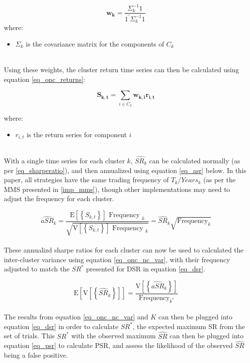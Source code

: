 \documentclass[a4paper,11pt,oneside]{article}
\theoremstyle{plain}
\theoremstyle{definition}
\begin{document}
	\begin{equation}\label{eq_onc_weights}
	\mathbf{w_{k}}=\frac{\Sigma_{k}^{-1} 1}{1^{\prime} \Sigma_{k}^{-1} 1}
	\end{equation}
		where:
	\begin{itemize}
		\item[] $\Sigma_k$ is the covariance matrix for the components of $C_k$
	\end{itemize}
	~\\
	Using these weights, the cluster return time series can then be calculated using equation \ref{eq_onc_returns}:
	
	\begin{equation}\label{eq_onc_returns}
	\mathbf{S_{k, t}}=\sum_{i \in C_{k}} \mathbf{w_{k, i}} \mathbf{r_{i, t}}
	\end{equation}

	where:
		\begin{itemize}
			\item[] $r_{i,t}$ is the return series for component $i$
		\end{itemize}
	~\\
	With a single time series for each cluster $k$, $\widehat{SR_k}$ can be calculated normally (as per \ref{eq_sharperatio}), and then annualized using equation \ref{eq_asr} below. In this paper, all strategies have the same trading frequency of $T_k/Years_k$ (as per the MMS presented in \ref{imp_mms}), though other implementations may need to adjust the frequency for each cluster.
		
	\begin{equation}\label{eq_asr}
	\widehat{a S R}_{k}=\frac{\mathrm{E}\left[\left\{S_{k, t}\right\}\right] \text { Frequency }_{k}}{\sqrt{\mathrm{V}\left[\left\{S_{k, t}\right\}\right] \text { Frequency }_{k}}}=\widehat{S R}_{k} \sqrt{\text {Frequency}_{k}}
	\end{equation}
	~\\
	These annualizd sharpe ratios for each cluster can now be used to calculated the inter-cluster variance using equation \ref{eq_onc_nc_var}, with their frequency adjusted to match the $SR^*$ presented for DSR in equation \ref{eq_dsr}. 
		
	\begin{equation}\label{eq_onc_nc_var}
	\mathrm{E}\left[\mathrm{V}\left[\left\{\widehat{S R}_{k}\right\}\right]\right]=\frac{\mathrm{V}\left[\left\{\widehat{a S R}_{k}\right\}\right]}{\text {Frequency}_{k^{*}}}
	\end{equation}
	~\\
	The results from equation \ref{eq_onc_nc_var} and $K$ can then be plugged into equation \ref{eq_dsr} in order to calculate $SR^*$, the expected maximum SR from the set of trials. This $SR^*$ with the observed maximum $\widehat{SR}$ can then be plugged into equation \ref{eq_psr} to calculate PSR, and assess the likelihood of the observed $\widehat{SR}$ being a false positive.
		
\end{document}
